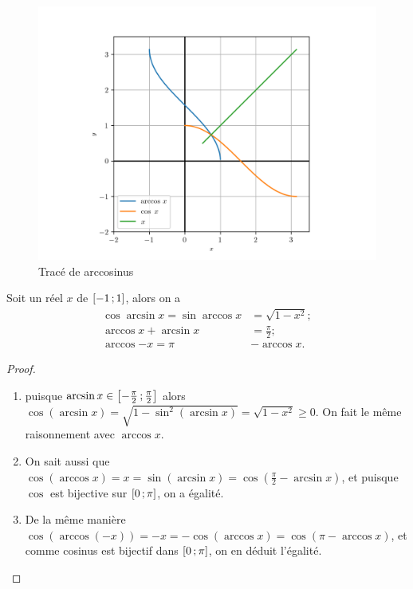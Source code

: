 \begin{figure}
  \centering
  \includegraphics[scale = 0.8]{arccos.png}
  \caption{Tracé de arccosinus}\label{fig:tracearccosinus}
\end{figure}

\begin{prop}
  Soit un réel \(x\) de \(\left[ -1 \, ; {} 1 \right]\), alors on a
  \begin{align*}
    \cos{\arcsin{x}} = \sin{\arccos{x}}& = \sqrt{1-x^2}; \\
    \arccos{x} + \arcsin{x} &= \frac{\pi}{2};\\
    \arccos{-x} = \pi{}&- \arccos{x}.
  \end{align*}
\end{prop}

\begin{proof}
  \begin{enumerate}
    \item puisque \(\arcsin x \in
      \left[ -\frac{\pi}{2} \, ; {} \frac{\pi}{2} \right]\) alors \(\cos( \arcsin x) =
      \sqrt{1- \sin^2(\arcsin x)} = \sqrt{1-x^2} \geqslant 0\).
      On fait le même raisonnement avec \(\arccos x\).
    \item On sait aussi que \(\cos(\arccos x) = x = \sin(\arcsin x) =
      \cos\left(\frac{\pi}{2} - \arcsin x\right)\),
      et puisque \(\cos\) est bijective sur \(\left[ 0 \, ; {} \pi \right]\), on a
      égalité.
    \item De la même manière \(\cos(\arccos(-x)) = -x = -\cos(\arccos x) =
      \cos(\pi - \arccos x)\), et comme cosinus est bijectif dans
      \(\left[ 0 \, ; {} \pi \right]\), on en déduit l'égalité.
  \end{enumerate}
\end{proof}

